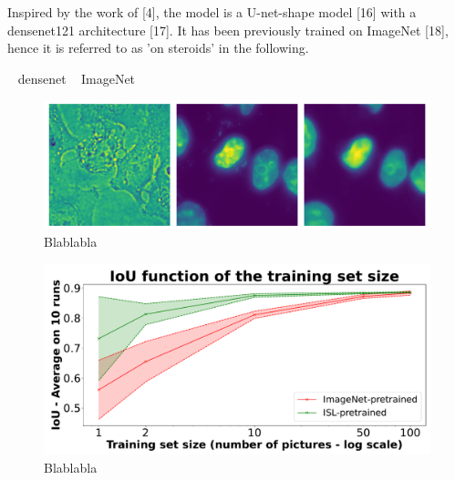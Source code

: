 Inspired by the work of [4], the model is a U-net-shape model [16] with
a densenet121 architecture [17]. It has been previously trained on ImageNet
[18], hence it is referred to as ’on steroids’ in the following.

~\cite{Huang_2017_CVPR} densenet
~\cite{Deng_2009} ImageNet

\begin{figure}[]
    \centering
    \includegraphics[width=\textwidth]{figures/chapter3/insilico_prediction}
    \caption[Blablabla]{Blablabla}
    \label{fig:blabla}
\end{figure}

\begin{figure}[]
    \centering
    \includegraphics[width=\textwidth]{figures/chapter3/insilico_training_size}
    \caption[Blablabla]{Blablabla}
    \label{fig:blablabla}
\end{figure}



